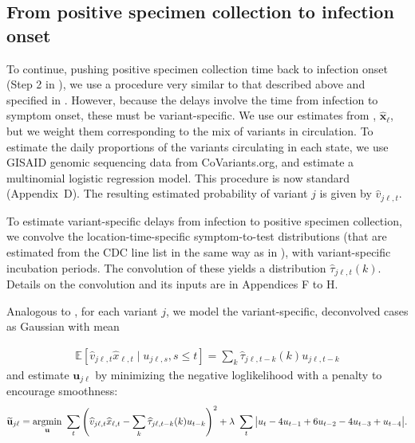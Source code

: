 \subsection{From positive specimen collection to infection onset}
\label{sec:step2-and-3}


To continue, pushing positive specimen collection time back to infection onset
(Step 2 in ), we use a procedure very
similar to that described above and specified in
. However, because
the delays involve the time from infection to symptom onset, these must be
variant-specific.
We use our estimates from ,
$\widehat{\mathbf{x}}_\ell$, but we weight them corresponding to the mix of
variants in circulation. To estimate the daily proportions of the variants
circulating in each state, we use GISAID genomic sequencing data from
CoVariants.org, \citep{hodcroft2021covariants, elbe2017data} and estimate a
multinomial logistic regression model. This procedure is now standard
(Appendix~D).
\citep{obermeyer2022analysis, annavajhala2021emergence, figgins2021sars}  The resulting
estimated probability of variant $j$ is given by $\hat{v}_{j\ell,t}$.

To estimate variant-specific delays from infection to positive specimen
collection, we convolve the location-time-specific symptom-to-test distributions
(that are estimated from the CDC line list in the same way as in
), with variant-specific incubation periods. The convolution of
these yields a distribution $\widehat{\tau}_{j\ell,t}(k)$. Details on the
convolution and its inputs are in Appendices F to H. 

\begin{linenomath*} 
Analogous to , for each variant $j$,
we model the variant-specific, deconvolved cases as Gaussian with mean
\end{linenomath*} 
\begin{linenomath*} 
\begin{align}
  \mathbb{E}\left[\widehat{v}_{j\ell,t}\widehat{x}_{\ell,t} \mid u_{j\ell,s}, s \leq t  \right] = \sum_k \widehat{\tau}_{j\ell,t-k}(k) u_{j\ell,t-k} 
\end{align}
and estimate $\mathbf{u}_{j\ell}$ by minimizing the negative loglikelihood with
a penalty to encourage smoothness:
\begin{align}
\widetilde{\mathbf{u}}_{j\ell} = \operatorname*{argmin}_{\mathbf{u}}\ \sum_{t} 
\left( 
    \widehat{v}_{j\ell,t} \widehat{x}_{\ell,t} -  
    \sum_k \widehat{\tau}_{j\ell,t-k}(k) u_{t-k} 
\right)^2 
+ \lambda\ \sum_{t} \big|u_{t} - 4u_{t-1} + 6u_{t-2} -4u_{t-3}+ u_{t-4}\big|.
\end{align} 
\end{linenomath*} 


